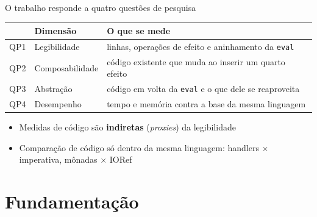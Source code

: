 \documentclass[aspectratio=169,10pt]{beamer}
\newcommand{\oc}[1]{\textcolor{ocamlc}{#1}}
\newcommand{\hs}[1]{\textcolor{haskellc}{#1}}
\begin{document}
\begin{frame}{O trabalho responde a quatro questões de pesquisa}
  \vspace{4pt}
  \begin{center}
  \begin{tabular}{lll}
    \toprule
    & \textbf{Dimensão} & \textbf{O que se mede} \\
    \midrule
    QP1 & Legibilidade & linhas, operações de efeito e aninhamento da \texttt{eval} \\
    QP2 & Composabilidade & código existente que muda ao inserir um quarto efeito \\
    QP3 & Abstração & código em volta da \texttt{eval} e o que dele se reaproveita \\
    QP4 & Desempenho & tempo e memória contra a base da mesma linguagem \\
    \bottomrule
  \end{tabular}
  \end{center}
  \vspace{8pt}
  \begin{itemize}
    \item Medidas de código são \textbf{indiretas} (\emph{proxies}) da legibilidade
    \item Comparação de código só dentro da mesma linguagem: \oc{handlers} $\times$ imperativa, \hs{mônadas} $\times$ IORef
  \end{itemize}
\end{frame}

\section{Fundamentação}
\end{document}
